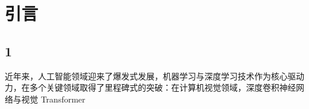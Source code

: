 \section{引言}
\subsection{1}
近年来，人工智能领域迎来了爆发式发展，机器学习与深度学习技术作为核心驱动力，在多个关键领域取得了里程碑式的突破：在计算机视觉领域，深度卷积神经网络与视觉 Transformer\cite{vaswani2017attention}
